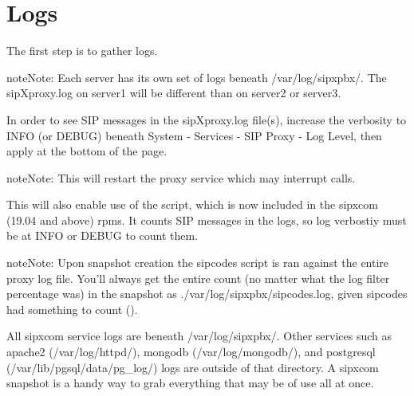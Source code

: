\documentclass[letterpaper,10pt,english]{sphinxmanual}
\begin{document}


\section{Logs}
\label{\detokenize{troubleshooting:logs}}
The first step is to gather logs.

\begin{sphinxadmonition}{note}{Note:}
Each server has its own set of logs beneath /var/log/sipxpbx/. The sipXproxy.log on server1 will be different than on server2 or server3.
\end{sphinxadmonition}

In order to see SIP messages in the sipXproxy.log file(s), increase the verbosity to INFO (or DEBUG) beneath System - Services - SIP Proxy - Log Level, then apply at the bottom of the page.

\begin{sphinxadmonition}{note}{Note:}
This will restart the proxy service which may interrupt calls.
\end{sphinxadmonition}


This will also enable use of the {\hyperref[\detokenize{troubleshooting:sipcodes}]{}} script, which is now included in the sipxcom (19.04 and above) rpms. It counts SIP messages in the logs, so log verbostiy must be at INFO or DEBUG to count them.

\begin{sphinxadmonition}{note}{Note:}
Upon snapshot creation the sipcodes script is ran against the entire proxy log file.
You’ll always get the entire count (no matter what the log filter percentage was) in the snapshot as ./var/log/sipxpbx/sipcodes.log, given sipcodes had something to count ().
\end{sphinxadmonition}

All sipxcom service logs are beneath /var/log/sipxpbx/. Other services such as apache2 (/var/log/httpd/), mongodb (/var/log/mongodb/), and postgresql (/var/lib/pgsql/data/pg\_log/) logs are outside of that directory.
A sipxcom snapshot is a handy way to grab everything that may be of use all at once.
\end{document}
